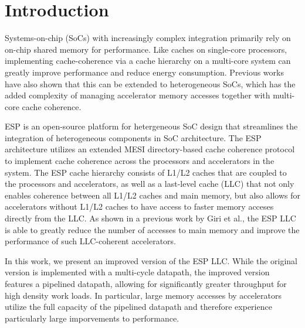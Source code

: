 \section{Introduction}
\label{sec:intro}

Systems-on-chip (SoCs) with increasingly complex integration primarily rely on on-chip shared memory for performance. Like caches on single-core processors,
implementing cache-coherence via a cache hierarchy on a multi-core system can greatly improve performance and reduce energy consumption. Previous works have also shown that this can be
extended to heterogeneous SoCs, which has the added complexity of managing accelerator memory accesses together with multi-core cache coherence.
\par ESP is an open-source platform for hetergeneous SoC design that streamlines the integration of heterogeneous components in SoC architecture.
The ESP architecture utilizes an extended MESI directory-based cache coherence protocol to implement cache coherence across the processors and accelerators in the system. The ESP cache hierarchy consists of L1/L2 caches that are coupled
to the processors and accelerators, as well as a last-level cache (LLC) that not only enables coherence between all L1/L2 caches and main memory, but also allows for accelerators without L1/L2 caches to have access to
faster memory acceses directly from the LLC. As shown in a previous work by Giri et al., the ESP LLC is able to greatly reduce the number of accesses to main memory and improve the performance of such LLC-coherent accelerators.
\par In this work, we present an improved version of the ESP LLC. While the original version is implemented with a multi-cycle datapath, the improved version features a pipelined datapath, 
allowing for significantly greater throughput for high density work loads. In particular, large memory accesses by accelerators utilize the full capacity of the pipelined datapath and therefore experience particularly large imporvements 
to performance.
